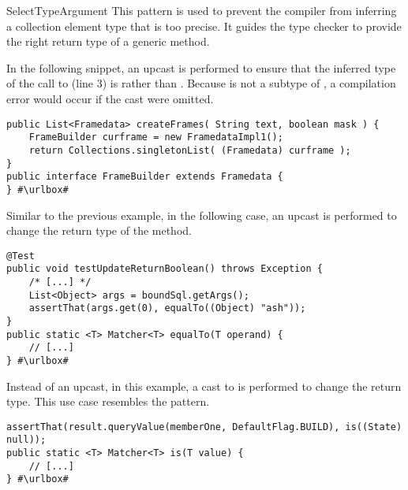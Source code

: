 \begin{pattern}{SelectTypeArgument}
This pattern is used to prevent the compiler
from inferring a collection element type that is too precise.
It guides the type checker to provide the right return type of a generic method.


\instances{}
In the following snippet, an upcast is performed to ensure that the
inferred type of the call to  (line 3)
is  rather than .
Because  is not a subtype of ,
a compilation error would occur if the cast were omitted.

\def\urlvar{http://bit.ly/arpruss_raspberryjammod_2USL7Ai}
\begin{verbatim}
public List<Framedata> createFrames( String text, boolean mask ) {
    FrameBuilder curframe = new FramedataImpl1();
    return Collections.singletonList( (Framedata) curframe );
}
public interface FrameBuilder extends Framedata {
} #\urlbox#
\end{verbatim}

Similar to the previous example, in the following case,
an upcast is performed to change the return type of the
 method.

\def\urlvar{http://bit.ly/jfaster_mango_2EhXzUW}
\begin{verbatim}
@Test
public void testUpdateReturnBoolean() throws Exception {
    /* [...] */
    List<Object> args = boundSql.getArgs();
    assertThat(args.get(0), equalTo((Object) "ash"));
}
public static <T> Matcher<T> equalTo(T operand) {
    // [...]
} #\urlbox#
\end{verbatim}

Instead of an upcast, in this example,
a cast to  is performed to change the return type.
This use case resembles the  pattern.

\def\urlvar{http://bit.ly/EngineHub_WorldGuard_2IVUOx1}
\begin{verbatim}
assertThat(result.queryValue(memberOne, DefaultFlag.BUILD), is((State) null));
public static <T> Matcher<T> is(T value) {
    // [...]
} #\urlbox#
\end{verbatim}


\end{pattern}
